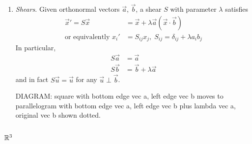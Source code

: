 \documentclass{../../template/note}
\begin{document}
    \begin{enumerate}[resume]
        \item \emph{Shears}. Given orthonormal vectors \(\vec a\), \(\vec b\), a shear \(S\) with parameter \(\lambda\) satisfies
        \begin{align*}
            \vec x' = S \vec x &= \vec x + \lambda \vec a (\vec x \cdot \vec b) \\
            \text{or equivalently }x_i' &= S_{ij} x_j, \; S_{ij} = \delta_{ij} + \lambda a_i b_j
        \end{align*}
        In particular,
        \begin{align*}
            S\vec a &= \vec a \\
            S\vec b &= \vec b + \lambda \vec a            
        \end{align*}
        and in fact \(S \vec u = \vec u\) for any \(\vec u \perp \vec b\).

        DIAGRAM: square with bottom edge vec a, left edge vec b moves to parallelogram with bottom edge vec a, left edge vec b plus lambda vec a, original vec b shown dotted.
        
    \end{enumerate}
    
    \subsubsection{\(\mathbb R^3\)}
    
\end{document}
